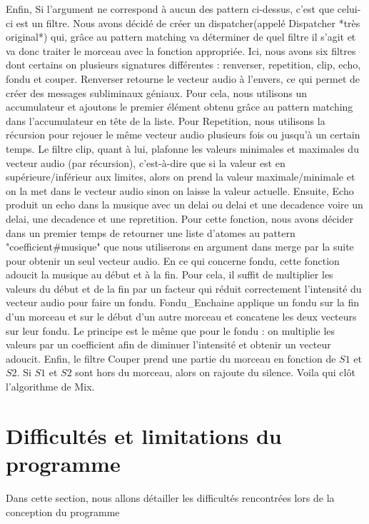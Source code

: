 \documentclass[a4paper,12pt]{article}
\begin{document}
Enfin, Si l'argument ne correspond à aucun des pattern ci-dessus, c'est que celui-ci est un filtre. Nous avons décidé de créer
un dispatcher(appelé Dispatcher *très original*) qui, grâce au pattern matching va déterminer de quel filtre il s'agit et va donc
traiter le morceau avec la fonction appropriée. Ici, nous avons six filtres dont certains on plusieurs signatures différentes :
renverser, repetition, clip, echo, fondu et couper. Renverser retourne le vecteur audio à l'envers, ce qui permet de créer des messages
subliminaux géniaux. Pour cela, nous utilisons un accumulateur et ajoutons le premier élément obtenu grâce au pattern matching
dans l'accumulateur en tête de la liste. Pour Repetition, nous utilisons la récursion pour rejouer le même vecteur audio plusieurs fois
ou jusqu'à un certain temps. Le filtre clip, quant à lui, plafonne les valeurs minimales et maximales du vecteur audio (par récursion),
c'est-à-dire que si la valeur est en supérieure/inférieur aux limites, alors on prend la valeur maximale/minimale et on la met
dans le vecteur audio sinon on laisse la valeur actuelle.  Ensuite, Echo produit un echo dans la musique avec un delai ou delai et
une decadence voire un delai, une decadence et une repretition. Pour cette fonction, nous avons décider dans un premier temps de retourner
une liste d'atomes au pattern "coefficient#musique" que nous utiliserons en argument dans merge par la suite pour obtenir un seul vecteur audio.
En ce qui concerne fondu, cette fonction adoucit la musique au début et à la fin. Pour cela, il suffit de multiplier les valeurs du début et
de la fin par un facteur qui réduit correctement l'intensité du vecteur audio pour faire un fondu. Fondu_Enchaine applique un fondu sur la fin
d'un morceau et sur le début d'un autre morceau et concatene les deux vecteurs sur leur fondu. Le principe est le même que pour le fondu :
on multiplie les valeurs par un coefficient afin de diminuer l'intensité et obtenir un vecteur adoucit. Enfin, le filtre Couper prend une partie
du morceau en fonction de $S1$ et $S2$. Si $S1$ et $S2$ sont hors du morceau, alors on rajoute du silence. Voila qui clôt l'algorithme de Mix.

\section{Difficultés et limitations du programme}

Dans cette section, nous allons détailler les difficultés rencontrées lors de la conception du programme
\end{document}
